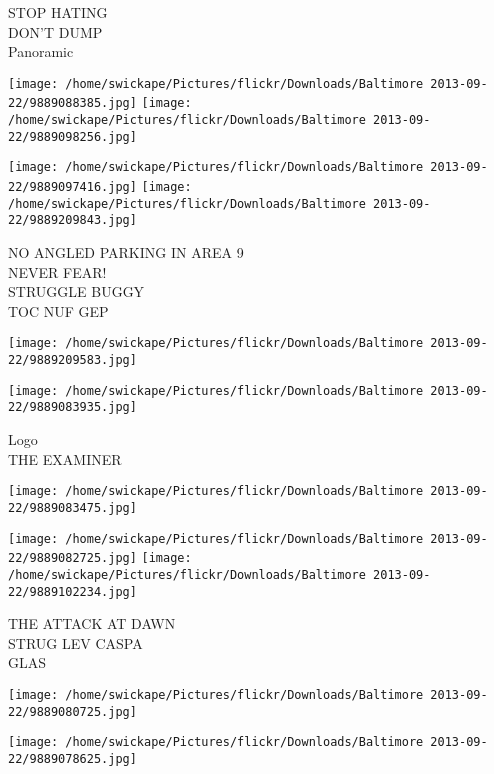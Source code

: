\documentclass[10pt,letterpaper]{article}
\begin{document}
STOP HATING\\
DON'T DUMP\\
Panoramic\\
\pagebreak

\texttt{[image: /home/swickape/Pictures/flickr/Downloads/Baltimore 2013-09-22/9889088385.jpg]}
\texttt{[image: /home/swickape/Pictures/flickr/Downloads/Baltimore 2013-09-22/9889098256.jpg]}

\texttt{[image: /home/swickape/Pictures/flickr/Downloads/Baltimore 2013-09-22/9889097416.jpg]}
\texttt{[image: /home/swickape/Pictures/flickr/Downloads/Baltimore 2013-09-22/9889209843.jpg]}

NO ANGLED PARKING IN AREA 9\\
NEVER FEAR!\\
STRUGGLE BUGGY\\
TOC NUF GEP\\
\pagebreak

\texttt{[image: /home/swickape/Pictures/flickr/Downloads/Baltimore 2013-09-22/9889209583.jpg]}

\vspace{0.25in}
\texttt{[image: /home/swickape/Pictures/flickr/Downloads/Baltimore 2013-09-22/9889083935.jpg]}

Logo\\
THE EXAMINER\\
\pagebreak

\texttt{[image: /home/swickape/Pictures/flickr/Downloads/Baltimore 2013-09-22/9889083475.jpg]}

\vspace{0.25in}
\texttt{[image: /home/swickape/Pictures/flickr/Downloads/Baltimore 2013-09-22/9889082725.jpg]}
\texttt{[image: /home/swickape/Pictures/flickr/Downloads/Baltimore 2013-09-22/9889102234.jpg]}

THE ATTACK AT DAWN\\
STRUG LEV CASPA\\
GLAS\\
\pagebreak

\texttt{[image: /home/swickape/Pictures/flickr/Downloads/Baltimore 2013-09-22/9889080725.jpg]}

\vspace{0.25in}
\texttt{[image: /home/swickape/Pictures/flickr/Downloads/Baltimore 2013-09-22/9889078625.jpg]}
\end{document}
